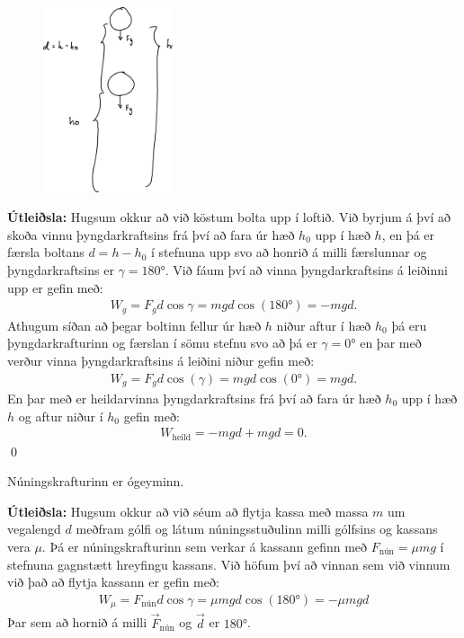 \ifdefined \wholebook \else\documentclass[oneside]{book}\usepackage{EdlBook}\graphicspath{{figures/}}
\begin{document}
\begin{minipage}{\linewidth}
\begin{figure}
\vspace{-0.5cm}
\includegraphics[width=1.5in]{temp/gravwork.pdf}
\end{figure}

\textbf{Útleiðsla:} Hugsum okkur að við köstum bolta upp í loftið. Við byrjum á því að skoða vinnu þyngdarkraftsins frá því að fara úr hæð $h_0$ upp í hæð $h$, en þá er færsla boltans $d = h-h_0$ í stefnuna upp svo að honrið á milli færslunnar og þyngdarkraftsins er $\gamma = \ang{180}$. Við fáum því að vinna þyngdarkraftsins á leiðinni upp er gefin með:
\begin{align*}
    W_g = F_g d \cos\gamma = mgd \cos(\ang{180}) = -mgd.
\end{align*}
Athugum síðan að þegar boltinn fellur úr hæð $h$ niður aftur í hæð $h_0$ þá eru þyngdarkrafturinn og færslan í sömu stefnu svo að þá er $\gamma = \ang{0}$ en þar með verður vinna þyngdarkraftsins á leiðini niður gefin með:
\begin{align*}
    W_g = F_g d \cos(\gamma) = mgd \cos(\ang{0}) = mgd.
\end{align*}
En þar með er heildarvinna þyngdarkraftsins frá því að fara úr hæð $h_0$ upp í hæð $h$ og aftur niður í $h_0$ gefin með:
\begin{align*}
    W_{\text{heild}} = -mgd + mgd = 0.
\end{align*}
\qed
\end{minipage}

\begin{tcolorbox}
\begin{theorem}
Núningskrafturinn er ógeyminn.
\end{theorem}
\end{tcolorbox}


\textbf{Útleiðsla:} Hugsum okkur að við séum að flytja kassa með massa $m$ um vegalengd $d$ meðfram gólfi og látum núningsstuðulinn milli gólfsins og kassans vera $\mu$. Þá er núningskrafturinn sem verkar á kassann gefinn með $F_{\text{nún}} = \mu mg$ í stefnuna gagnstætt hreyfingu kassans. Við höfum því að vinnan sem við vinnum við það að flytja kassann er gefin með:
\begin{align*}
    W_\mu = F_{\text{nún}} d \cos\gamma = \mu mg d \cos(\ang{180}) = -\mu mg d
\end{align*}
Þar sem að hornið á milli $\vec{F}_{\text{nún}}$ og $\vec{d}$ er $\ang{180}$.
\end{document}
